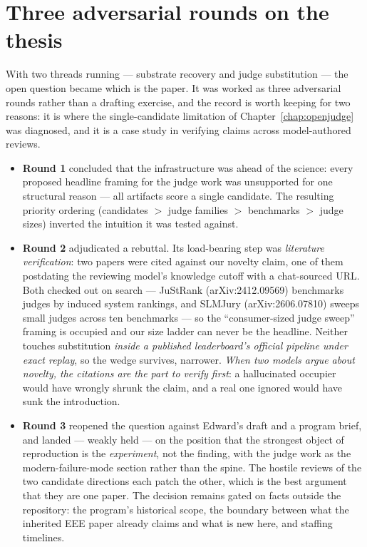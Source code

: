 \documentclass[11pt]{report}
\begin{document}
\section{Three adversarial rounds on the thesis}

With two threads running --- substrate recovery and judge substitution --- the
open question became which is the paper. It was worked as three adversarial rounds
rather than a drafting exercise, and the record is worth keeping for two reasons: it
is where the single-candidate limitation of Chapter~\ref{chap:openjudge} was
diagnosed, and it is a case study in verifying claims across model-authored reviews.

\begin{itemize}
  \item \textbf{Round 1} concluded that the infrastructure was ahead of the science:
        every proposed headline framing for the judge work was unsupported for one
        structural reason --- all artifacts score a single candidate. The resulting
        priority ordering (candidates $>$ judge families $>$ benchmarks $>$ judge
        sizes) inverted the intuition it was tested against.
  \item \textbf{Round 2} adjudicated a rebuttal. Its load-bearing step was
        \emph{literature verification}: two papers were cited against our novelty
        claim, one of them postdating the reviewing model's knowledge cutoff with a
        chat-sourced URL. Both checked out on search --- JuStRank
        (arXiv:2412.09569) benchmarks judges by induced system rankings, and
        SLMJury (arXiv:2606.07810) sweeps small judges across ten benchmarks --- so
        the ``consumer-sized judge sweep'' framing is occupied and our size ladder
        can never be the headline. Neither touches substitution \emph{inside a
        published leaderboard's official pipeline under exact replay}, so the wedge
        survives, narrower. \emph{When two models argue about novelty, the citations
        are the part to verify first}: a hallucinated occupier would have wrongly
        shrunk the claim, and a real one ignored would have sunk the introduction.
  \item \textbf{Round 3} reopened the question against Edward's draft and a program
        brief, and landed --- weakly held --- on the position that the strongest
        object of reproduction is the \emph{experiment}, not the finding, with the
        judge work as the modern-failure-mode section rather than the spine. The
        hostile reviews of the two candidate directions each patch the other, which
        is the best argument that they are one paper. The decision remains gated on
        facts outside the repository: the program's historical scope, the boundary
        between what the inherited EEE paper already claims and what is new here,
        and staffing timelines.
\end{itemize}
\end{document}
